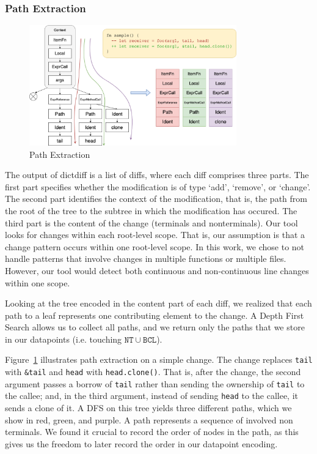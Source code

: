 \subsubsection{\label{sec:path_extraction}Path Extraction}

\begin{figure}[h]
\centering
\includegraphics[width=0.8\textwidth]{figs/extraction.png}
\caption{\label{fig:extraction}Path Extraction}
\end{figure}

The output of dictdiff is a list of diffs, where each diff comprises three parts. The first part specifies whether the modification is of type `add', `remove', or `change'. The second part identifies the context of the modification, that is, the path from the root of the tree to the subtree in which the modification has occured. The third part is the content of the change (terminals and nonterminals). Our tool looks for changes within each root-level scope. That is, our assumption is that a change pattern occurs within one root-level scope. In this work, we chose to not handle patterns that involve changes in multiple functions or multiple files. However, our tool would detect both continuous and non-continuous line changes within one scope.

Looking at the tree encoded in the content part of each diff, we realized that each path to a leaf represents one contributing element to the change. A Depth First Search allows us to collect all paths, and we return only the paths that we store in our datapoints (i.e. touching $\mathtt{NT} \cup \mathtt{BCL}$).

Figure~\ref{fig:extraction} illustrates path extraction on a simple change. The change replaces \verb+tail+ with \verb+&tail+ and \verb+head+ with \verb+head.clone()+. That is, after the change, the second argument passes a borrow of \verb+tail+ rather than sending the ownership of \verb+tail+ to the callee; and, in the third argument, instead of sending \verb+head+ to the callee, it sends a clone of it. A DFS on this tree yields three different paths, which we show in red, green, and purple. A path represents a sequence of involved non terminals. We found it crucial to record the order of nodes in the path, as this gives us the freedom to later record the order in our datapoint encoding.

